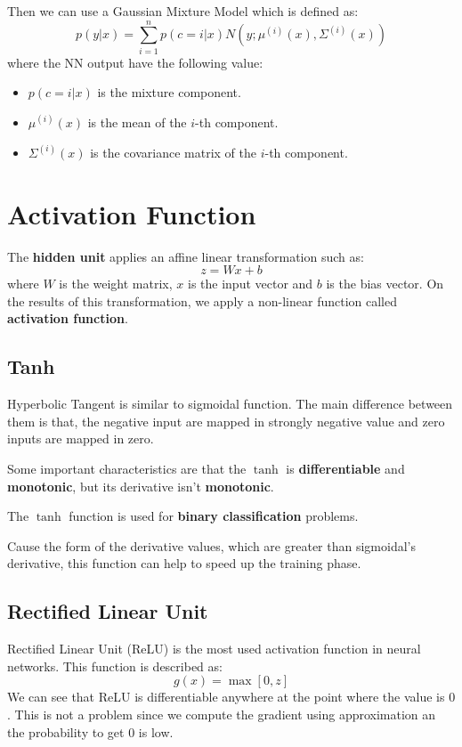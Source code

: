 Then we can use a Gaussian Mixture Model which is defined as:
\begin{equation}
    p(y|x) = \sum_{i=1}^n p(c= i|x) N(y; \mu^{(i)}(x), \Sigma^{(i)}(x))
\end{equation}
where the NN output have the following value:
\begin{itemize}
    \item $p(c=i|x)$ is the mixture component.
    \item $\mu^{(i)}(x)$ is the mean of the $i$-th component.
    \item $\Sigma^{(i)}(x)$ is the covariance matrix of the $i$-th component.
\end{itemize}

\section{Activation Function}
The \textbf{hidden unit} applies an affine linear transformation such as:
\begin{equation}
    z = Wx + b
\end{equation}
where $W$ is the weight matrix, $x$ is the input vector and $b$ is the bias vector.
On the results of this transformation, we apply a non-linear function called
\textbf{activation function}.

\subsection{Tanh}
Hyperbolic Tangent is similar to sigmoidal function. The main difference between
them is that, the negative input are mapped in strongly negative value and zero
inputs are mapped in zero.

Some important characteristics are that the $\tanh$ is \textbf{differentiable}
and \textbf{monotonic}, but its derivative isn't \textbf{monotonic}.
\begin{note}
    The $\tanh$ function is used for \textbf{binary classification} problems.
\end{note}

Cause the form of the derivative values, which are greater than sigmoidal's derivative,
this function can help to speed up the training phase.
\subsection{Rectified Linear Unit}
Rectified Linear Unit (ReLU) is the most used activation function in neural networks.
This function is described as:
\begin{equation}
    g(x) = \max[0,z]
\end{equation}
We can see that ReLU is differentiable anywhere at the point where the value is
$0$. This is not a problem since we compute the gradient using approximation an
the probability to get $0$ is low.

